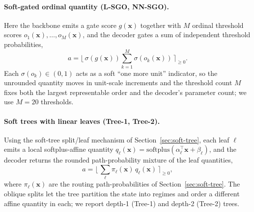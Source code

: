 \documentclass[11pt]{article}
\begin{document}
\paragraph{Soft-gated ordinal quantity (L-SGO, NN-SGO).}
Here the backbone emits a gate score $g(\mathbf{x})$ together with $M$ ordinal threshold scores
$o_1(\mathbf{x}),\dots,o_M(\mathbf{x})$, and the decoder gates a sum of independent threshold
probabilities,
\[
a = \Big\lfloor\,\sigma(g(\mathbf{x}))\sum_{k=1}^{M}\sigma(o_k(\mathbf{x}))\,\Big\rceil_{\ge 0}.
\]
Each $\sigma(o_k)\in(0,1)$ acts as a soft ``one more unit'' indicator, so the unrounded quantity moves
in unit-scale increments and the threshold count $M$ fixes both the largest representable order and
the decoder's parameter count; we use $M=20$ thresholds.

\paragraph{Soft trees with linear leaves (Tree-1, Tree-2).}
Using the soft-tree split/leaf mechanism of Section~\ref{sec:soft-tree}, each leaf $\ell$ emits a
local softplus-affine quantity $q_\ell(\mathbf{x})=\mathrm{softplus}(\alpha_\ell^\top\mathbf{x}+\beta_\ell)$,
and the decoder returns the rounded path-probability mixture of the leaf quantities,
\[
a = \Big\lfloor\,\sum_\ell \pi_\ell(\mathbf{x})\,q_\ell(\mathbf{x})\,\Big\rceil_{\ge 0},
\]
where $\pi_\ell(\mathbf{x})$ are the routing path-probabilities of Section~\ref{sec:soft-tree}. The
oblique splits let the tree partition the state into regimes and order a different affine quantity in
each; we report depth-1 (Tree-1) and depth-2 (Tree-2) trees.
\end{document}
